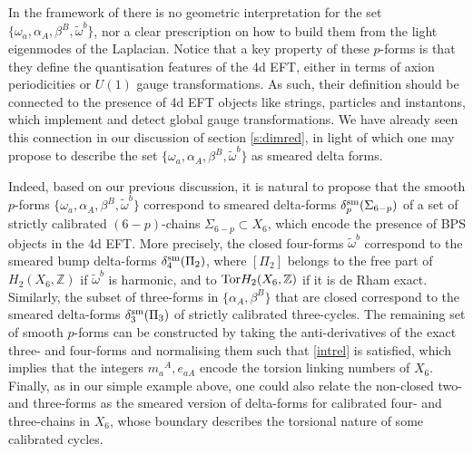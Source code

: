 \documentclass[11pt]{article}
\def\a {\alpha}
\def\b {\beta}
\def\om{\omega}
\newcommand{\IZ}{\mathbb{Z}}
\begin{document}
In the framework of \cite{Grana:2005ny,Kashani-Poor:2006ofe} there is no geometric interpretation for the set $\{\om_a, \a_A, \b^B, \tilde{\om}^b\}$, nor a clear prescription on how to build them from the light eigenmodes of the Laplacian. Notice that a key property of these $p$-forms is that they define the quantisation features of the 4d EFT, either in terms of axion periodicities or $U(1)$ gauge transformations. As such, their definition should be connected to the presence of 4d EFT objects like strings, particles and instantons, which implement and detect global gauge transformations. We have already seen this connection in our discussion of section \ref{s:dimred}, in light of which one may propose to describe the set $\{\om_a, \a_A, \b^B, \tilde{\om}^b\}$ as smeared delta forms. 

Indeed, based on our previous discussion, it is natural to propose that the smooth $p$-forms $\{\om_a, \a_A, \b^B, \tilde{\om}^b\}$ correspond to smeared delta-forms $\delta^{\rm sm}_p(\Sigma_{6-p})$ of a set of strictly calibrated $(6-p)$-chains $\Sigma_{6-p} \subset X_6$, which encode the presence of BPS objects in the 4d EFT. More precisely, the closed four-forms $\tilde{\om}^b$ correspond to the smeared bump delta-forms $\delta^{\rm sm}_4(\Pi_2)$, where $[\Pi_2]$ belongs to the free part of $H_2(X_6, \IZ)$ if $\tilde{\om}^b$ is harmonic, and to ${\rm Tor} H_2(X_6, \IZ)$ if it is de Rham exact. Similarly, the subset of three-forms in $\{ \a_A, \b^B\}$ that are closed correspond to the smeared delta-forms $\delta^{\rm sm}_3(\Pi_3)$ of strictly calibrated three-cycles. The remaining set of smooth $p$-forms can be constructed by taking the anti-derivatives of the exact three- and four-forms and normalising them such that \eqref{intrel} is satisfied, which implies that the integers $m_a{}^A, e_{aA}$ encode the torsion linking numbers of $X_6$. Finally, as in our simple example above, one could also relate the non-closed two- and three-forms as the smeared version of delta-forms for calibrated four- and three-chains in $X_6$, whose boundary describes the torsional nature of some calibrated cycles. 
\end{document}

